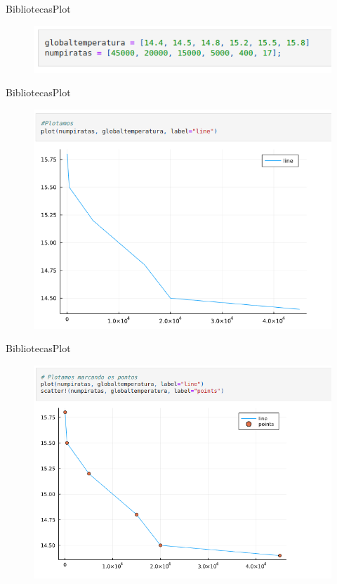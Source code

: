 \documentclass{beamer}
\begin{document}
\begin{frame}{Bibliotecas}{Plot}
    \begin{figure}
        \centering
        \includegraphics[scale=0.5]{imagens/plot02.png}
        \label{fig:my_label}
    \end{figure}
\end{frame}

\begin{frame}{Bibliotecas}{Plot}
    \begin{figure}
        \centering
        \includegraphics[scale=0.4]{imagens/plot03.png}
        \label{fig:my_label}
    \end{figure}
\end{frame}

\begin{frame}{Bibliotecas}{Plot}
    \begin{figure}
        \centering
        \includegraphics[scale=0.35]{imagens/plot04.png}
        \label{fig:my_label}
    \end{figure}
\end{frame}
\end{document}

